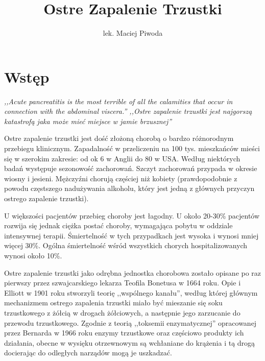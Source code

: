 \documentclass[a4paper, 12pt]{report}
\author{lek. Maciej Piwoda}
\title{Ostre Zapalenie Trzustki}
\newcommand\blankpage{\newpage \null \thispagestyle{empty} \addtocounter{page}{-1}}
\begin{document}
\date{}
\maketitle
\blankpage
\tableofcontents
\thispagestyle{empty}
\addtocounter{page}{-1}
\blankpage
\chapter*{Wstęp}
{\sl,,Acute pancreatitis is the most terrible of all the calamities
that occur in connection with the abdominal viscera.''
\newline
\newline
,,Ostre zapalenie trzustki jest najgorszą katastrofą jaka może mieć
miejsce w jamie brzusznej''}
{}
\newline
\newline
\newline
\begin{indent}
Ostre zapalenie trzustki jest dość złożoną chorobą o bardzo
różnorodnym przebiegu klinicznym. Zapadalność w przeliczeniu na 100
tys. mieszkańców mieści się w szerokim zakresie: od ok 6 w Anglii do
80 w USA. Według niektórych badań\cite{7} występuje sezonowość zachorowań.
Szczyt zachorowań przypada w okresie wiosny i jesieni.
Mężczyźni chorują częściej niż kobiety (prawdopodobnie z powodu
częstszego nadużywania alkoholu, który jest jedną z głównych przyczyn
ostrego zapalenie trzustki).

U większości pacjentów przebieg choroby jest łagodny. U około 20-30\%
pacjentów rozwija się jednak ciężka postać choroby, wymagająca pobytu
w oddziale intensywnej terapii. Śmiertelność w tych przypadkach jest
wysoka i wynosi mniej więcej 30\%. Ogólna śmiertelność wśród
wszystkich chorych hospitalizowanych wynosi około 10\%.

Ostre zapalenie trzustki jako odrębna jednostka chorobowa zostało
opisane po raz pierwszy przez szwajcarskiego lekarza
Teofila Bonetusa w 1664 roku. Opie i Elliott w 1901 roku stworzyli teorię
,,wspólnego kanału'', według której głównym mechanizmem ostrego
zapalenia trzustki miało być mieszanie się soku trzustkowego z żółcią
w drogach żółciowych, a następnie jego zarzucanie do przewodu
trzustkowego. Zgodnie z teorią ,,toksemii enzymatycznej'' opracowanej
przez Bernarda w 1966 roku enzymy trzustkowe oraz częściowo produkty ich działania,
obecne w wysięku otrzewnowym są wchłaniane do krążenia i tą drogą
docierając do odległych narządów mogą je uszkadzać.
\end{indent}
\end{document}

